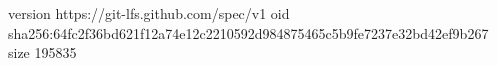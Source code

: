 version https://git-lfs.github.com/spec/v1
oid sha256:64fc2f36bd621f12a74e12c2210592d984875465c5b9fe7237e32bd42ef9b267
size 195835
